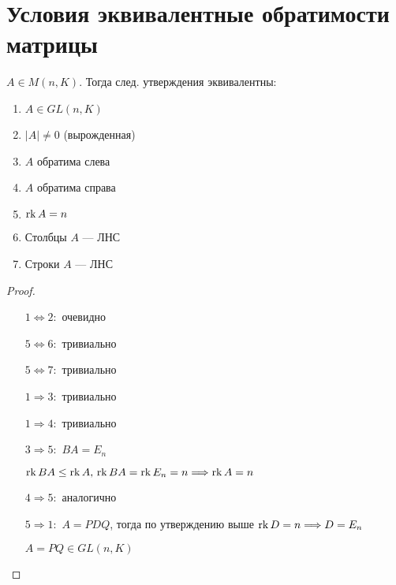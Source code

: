 
\section{Условия эквивалентные обратимости матрицы}

\begin{theorem-non} 
    
    $A \in M(n, K)$. Тогда след. утверждения эквивалентны:

    \begin{enumerate}
        \item $A \in GL(n, K)$
        \item $|A| \neq 0$ (вырожденная)
        \item $A$ обратима слева
        \item $A$ обратима справа
        \item $\operatorname{rk} A = n$
        \item Столбцы $A$ --- ЛНС
        \item Строки $A$ --- ЛНС
    \end{enumerate}

    \begin{proof}
        \
        \begin{itemize}
            \item[$1 \Leftrightarrow 2:$] очевидно
            \item[$5 \Leftrightarrow 6:$] тривиально
            \item[$5 \Leftrightarrow 7:$] тривиально 
            \item[$1 \Rightarrow 3:$] тривиально 
            \item[$1 \Rightarrow 4:$] тривиально 
            \item[$3 \Rightarrow 5:$] $BA = E_n$
            
            $\operatorname{rk} BA \leq \operatorname{rk} A,\, \operatorname{rk} BA = \operatorname{rk} E_n = n \Longrightarrow \operatorname{rk} A = n$

            \item[$4 \Rightarrow 5:$] аналогично
            \item[$5 \Rightarrow 1:$] $A = PDQ$, тогда по утверждению выше $\operatorname{rk} D = n \Longrightarrow D = E_n$
            
            $A = PQ \in GL(n, K)$
        \end{itemize}

    \end{proof}

\end{theorem-non}

